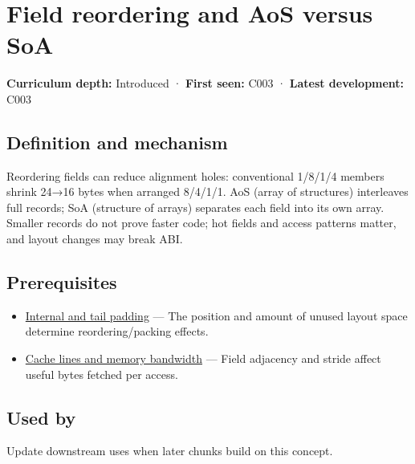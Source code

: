 \hypertarget{appendix-5522ad176ca0}{}\label{referencestart:appendix-5522ad176ca0}
\section{Field reordering and AoS versus SoA}\label{appendix-5522ad176ca0-field-reordering-and-aos-versus-soa}

\textbf{Curriculum depth:} Introduced · \textbf{First seen:} C003 · \textbf{Latest development:} C003

\begin{allmightroledefinition}

\subsection{Definition and mechanism}\label{appendix-5522ad176ca0-definition-and-mechanism}

Reordering fields can reduce alignment holes: conventional 1/8/1/4 members shrink 24→16 bytes when arranged 8/4/1/1. AoS (array of structures) interleaves full records; SoA (structure of arrays) separates each field into its own array. Smaller records do not prove faster code; hot fields and access patterns matter, and layout changes may break ABI.

\end{allmightroledefinition}

\subsection{Prerequisites}\label{appendix-5522ad176ca0-prerequisites}

\begin{itemize}
\tightlist
\item
  \hyperref[appendix-f52f8c5a3afd]{Internal and tail padding} --- The position and amount of unused layout space determine reordering/packing effects.
\item
  \hyperref[appendix-e4ccdbab8320]{Cache lines and memory bandwidth} --- Field adjacency and stride affect useful bytes fetched per access.
\end{itemize}

\subsection{Used by}\label{appendix-5522ad176ca0-used-by}

Update downstream uses when later chunks build on this concept.

